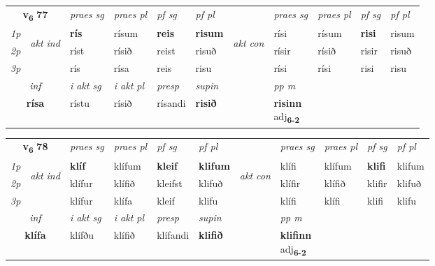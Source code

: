 \noindent
\begin{tabular}{lllllllllll} \toprule
\multicolumn{2}{c}{\textbf{v{\textsubscript{6}}} \Large{\textbf{77}}}  &  \textit{praes sg}  & \textit{praes pl}  &\textit{ pf sg} & \textit{pf pl} &  &  \textit{praes sg}  & \textit{praes pl}  & \textit{pf sg} & \textit{pf pl } \\*
	\cmidrule{3-6} \cmidrule{8-11}
 {\textit{1p}} & \multirow{3}{*}{\begin{turn}{90}\textit{akt ind}\end{turn}} & \textbf{rís} & rísum & \textbf{reis} & \textbf{risum} & \multirow{3}{*}{\begin{turn}{90}\textit{akt con}\end{turn}} &rísi & rísum & \textbf{risi} & risum\\*
 {\textit{2p}} &  &  ríst  & rísið & reist & risuð & & rísir & rísið & risir & risuð \\*
{\textit{3p}} &  & rís & rísa & reis & risu & & rísi & rísi& risi & risu \\*
\cmidrule{3-6} \cmidrule{8-11}

   \multicolumn{2}{c}{\textit{inf}}  & \textit{i akt sg} & \textit{i akt pl}   & \textit{presp} & \textit{supin}  && \textit{pp m} \\*
  \multicolumn{2}{c}{\textbf{rísa}} & rístu  & rísið   & rísandi &  \textbf{risið}  && \specialcell{\textbf{risinn} \\ adj\textbf{\textsubscript{6-2}}} \\*
\end{tabular}

\noindent
\begin{tabular}{lllllllllll} \toprule
\multicolumn{2}{c}{\textbf{v{\textsubscript{6}}} \Large{\textbf{78}}}  &  \textit{praes sg}  & \textit{praes pl}  &\textit{ pf sg} & \textit{pf pl} &  &  \textit{praes sg}  & \textit{praes pl}  & \textit{pf sg} & \textit{pf pl } \\*
	\cmidrule{3-6} \cmidrule{8-11}
 {\textit{1p}} & \multirow{3}{*}{\begin{turn}{90}\textit{akt ind}\end{turn}} & \textbf{klíf} & klífum & \textbf{kleif} & \textbf{klifum} & \multirow{3}{*}{\begin{turn}{90}\textit{akt con}\end{turn}} &klífi & klífum & \textbf{klifi} & klifum\\*
 {\textit{2p}} &  &  klífur  & klífið & kleifst & klifuð & & klífir & klífið & klifir & klifuð \\*
{\textit{3p}} &  & klífur & klífa & kleif & klifu & & klífi & klífi& klifi & klifu \\*
\cmidrule{3-6} \cmidrule{8-11}

   \multicolumn{2}{c}{\textit{inf}}  & \textit{i akt sg} & \textit{i akt pl}   & \textit{presp} & \textit{supin}  && \textit{pp m} \\*
  \multicolumn{2}{c}{\textbf{klífa}} & klífðu  & klífið   & klífandi &  \textbf{klifið}  && \specialcell{\textbf{klifinn} \\ adj\textbf{\textsubscript{6-2}}} \\*
\end{tabular}

